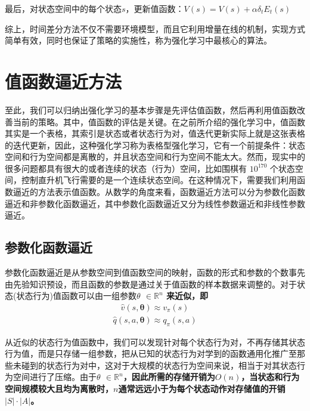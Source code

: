 最后，对状态空间中的每个状态$s$，更新值函数：$V(s)=V(s)+\alpha \delta_{t} E_{t}(s)$

综上，时间差分方法不仅不需要环境模型，而且它利用增量在线的机制，实现方式简单有效，同时也保证了策略的实施性，称为强化学习中最核心的算法。

\section{值函数逼近方法}
至此，我们可以归纳出强化学习的基本步骤是先评估值函数，然后再利用值函数改善当前的策略。其中，值函数的评估是关键。在之前所介绍的强化学习中，值函数其实是一个表格，其索引是状态或者状态行为对，值迭代更新实际上就是这张表格的迭代更新，因此，这种强化学习称为表格型强化学习，它有一个前提条件：状态空间和行为空间都是离散的，并且状态空间和行为空间不能太大。然而，现实中的很多问题都具有很大的或者连续的状态（行为）空间，比如围棋有 $10^{170}$  个状态空间，控制直升机飞行需要的是一个连续状态空间。在这种情况下，需要我们利用函数逼近的方法表示值函数。从数学的角度来看，函数逼近方法可以分为参数化函数逼近和非参数化函数逼近，其中参数化函数逼近又分为线性参数逼近和非线性参数逼近。

\subsection{参数化函数逼近}
参数化函数逼近是从参数空间到值函数空间的映射，函数的形式和参数的个数事先由先验知识预设，而且函数的参数是通过关于值函数的样本数据来调整的。对于状态(状态行为)值函数可以由一组参数\bfseries $\theta$ \mdseries $\in \mathbb{R}^{n} $ 来近似，即
\begin{equation}
\label{seq_2_3_1}
\begin{aligned}
\hat{v}(s,\mathbf{\theta})\approx v_{\pi}(s)
\end{aligned}
\end{equation}
\begin{equation}
\label{seq_2_3_2}
\begin{aligned}
\hat{q}(s,a,\mathbf{\theta})\approx q_{\pi}(s,a)
\end{aligned}
\end{equation}

从近似的状态行为值函数中，我们可以发现针对每个状态行为对，不再存储其状态行为值，而是只存储一组参数，把从已知的状态行为对学到的函数通用化推广至那些未碰到的状态行为对中，这对于大规模的状态行为空间来说，相当于对其状态行为空间进行了压缩。由于\bfseries $\theta$ \mdseries $\in \mathbb{R}^{n}$，因此所需的存储开销为$O(n)$，当状态和行为空间规模较大且均为离散时，$n$通常远远小于为每个状态动作对存储值的开销$|S|\cdot|A|$。


